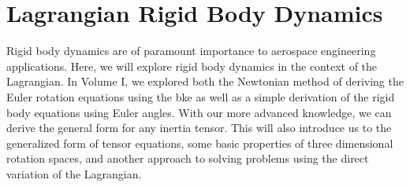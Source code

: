\section{Lagrangian Rigid Body Dynamics}
Rigid body dynamics are of paramount importance to aerospace engineering applications. Here, we will explore rigid body dynamics in the context of the \gls{Lagrangian}. In Volume I, we explored both the Newtonian method of deriving the Euler rotation equations using the \gls{bke} as well as a simple derivation of the rigid body equations using Euler angles. With our more advanced knowledge, we can derive the general form for any inertia tensor. This will also introduce us to the generalized form of tensor equations, some basic properties of three dimensional rotation spaces, and another approach to solving problems using the direct variation of the \gls{Lagrangian}.

